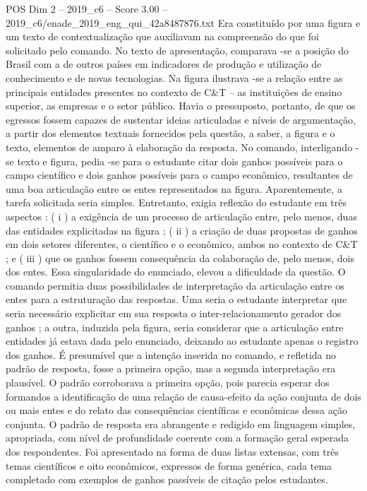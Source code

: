 \begin{textsample}{POS Dim 2 – 2019\_c6 – Score 3.00 – 2019\_c6/enade\_2019\_eng\_qui\_42a8487876.txt}
Era constituído por uma figura e um texto de contextualização que auxiliavam na compreensão do que foi solicitado pelo comando.
No texto de apresentação, comparava -se a posição do Brasil com a de outros países em indicadores de produção e utilização de conhecimento e de novas tecnologias.
Na figura ilustrava -se a relação entre as principais entidades presentes no contexto de C\&T – as instituições de ensino superior, as empresas e o setor público.
Havia o pressuposto, portanto, de que os egressos fossem capazes de sustentar ideias articuladas e níveis de argumentação, a partir dos elementos textuais fornecidos pela questão, a saber, a figura e o texto, elementos de amparo à elaboração da resposta.
No comando, interligando -se texto e figura, pedia -se para o estudante citar dois ganhos possíveis para o campo científico e dois ganhos possíveis para o campo econômico, resultantes de uma boa articulação entre os entes representados na figura.
Aparentemente, a tarefa solicitada seria simples.
Entretanto, exigia reflexão do estudante em três aspectos : ( i ) a exigência de um processo de articulação entre, pelo menos, duas das entidades explicitadas na figura ; ( ii ) a criação de duas propostas de ganhos em dois setores diferentes, o científico e o econômico, ambos no contexto de C\&T ; e ( iii ) que os ganhos fossem consequência da colaboração de, pelo menos, dois dos entes.
Essa singularidade do enunciado, elevou a dificuldade da questão.
O comando permitia duas possibilidades de interpretação da articulação entre os entes para a estruturação das respostas.
Uma seria o estudante interpretar que seria necessário explicitar em sua resposta o inter-relacionamento gerador dos ganhos ; a outra, induzida pela figura, seria considerar que a articulação entre entidades já estava dada pelo enunciado, deixando ao estudante apenas o registro dos ganhos.
É presumível que a intenção inserida no comando, e refletida no padrão de resposta, fosse a primeira opção, mas a segunda interpretação era plausível.
O padrão corroborava a primeira opção, pois parecia esperar dos formandos a identificação de uma relação de causa-efeito da ação conjunta de dois ou mais entes e do relato das consequências científicas e econômicas dessa ação conjunta.
O padrão de resposta era abrangente e redigido em linguagem simples, apropriada, com nível de profundidade coerente com a formação geral esperada dos respondentes.
Foi apresentado na forma de duas listas extensas, com três temas científicos e oito econômicos, expressos de forma genérica, cada tema completado com exemplos de ganhos passíveis de citação pelos estudantes.

\end{textsample}
